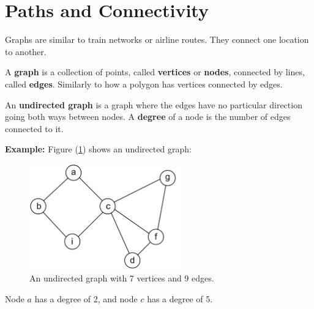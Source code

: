 \section{Paths and Connectivity}
Graphs are similar to train networks or airline routes. They connect one 
location to another.

\begin{Def}[Graph]

    A \textbf{graph} is a collection of points, called \textbf{vertices} or \textbf{nodes}, 
    connected by lines, called \textbf{edges}. Similarly to how a polygon has vertices connected by edges.

\end{Def}
\begin{Def}

    An \textbf{undirected graph} is a graph where the edges have no particular direction going both ways between nodes. 
    A \textbf{degree} of a node is the number of edges connected to it.
\end{Def}
\noindent
\textbf{Example:} Figure (\ref{fig:undir_graph}) shows an undirected graph:\\
\begin{figure}[h]
    \begin{center}
      \includegraphics[height=1.8in]{./Sections/graphs/undir_graph.png}
    \end{center}
     \caption{An undirected graph with 7 vertices and 9 edges.}\label{fig:undir_graph}
  \end{figure}

\noindent
Node $a$ has a degree of 2, and node $c$ has a degree of 5.\\
\newpage

